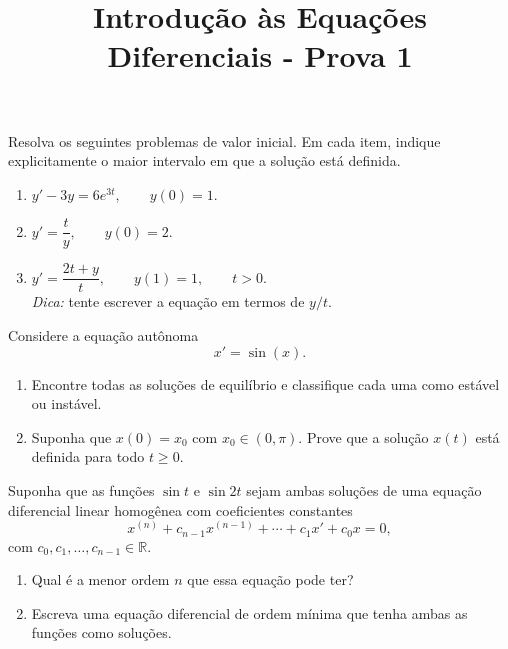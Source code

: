 \documentclass[10pt,a4paper]{amsart}
\title{Introdução às Equações Diferenciais - Prova 1}
\newcommand{\R}{\mathbb{R}}
\begin{document}
\maketitle


\vspace{5mm}

 Resolva os seguintes problemas de valor inicial. Em cada item, indique explicitamente o maior intervalo em que a solução está definida.
\begin{enumerate}[label=(\alph*)]
    \item $y' - 3y = 6e^{3t}, \qquad y(0) = 1.$
    \item $y' = \dfrac{t}{y}, \qquad y(0) = 2.$
    \item $y' = \dfrac{2t + y}{t}, \qquad y(1) = 1, \qquad t > 0.$ \\
    \emph{Dica:} tente escrever a equação em termos de $y/t$.
\end{enumerate}

\vspace{5mm}

 Considere a equação autônoma
\[
    x' = \sin(x).
\]
\begin{enumerate}[label=(\alph*)]
    \item Encontre todas as soluções de equilíbrio e classifique cada uma como estável ou instável.
    \item Suponha que $x(0) = x_0$ com $x_0 \in (0, \pi)$. Prove que a solução $x(t)$ está definida para todo $t \geq 0$.
\end{enumerate}

\vspace{5mm}

 Suponha que as funções $\sin t$ e $\sin 2t$ sejam ambas soluções de uma equação diferencial linear homogênea com coeficientes constantes
\[
    x^{(n)} + c_{n-1} x^{(n-1)} + \cdots + c_1 x' + c_0 x = 0,
\]
com $c_0, c_1, \ldots, c_{n-1} \in \R$.
\begin{enumerate}[label=(\alph*)]
    \item Qual é a menor ordem $n$ que essa equação pode ter?
    \item Escreva uma equação diferencial de ordem mínima que tenha ambas as funções como soluções.
\end{enumerate}
\end{document}
